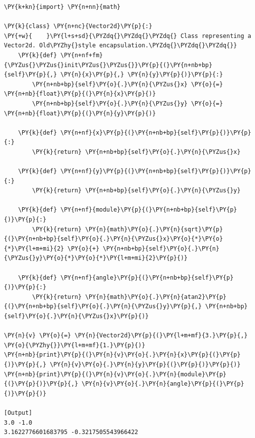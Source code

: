 \begin{Verbatim}[label=\makebox{\url{https://github.com/lucabaldini/cmepda/tree/master/slides/latex/snippets/vector2d\_old\_enc.py}},commandchars=\\\{\}]
\PY{k+kn}{import} \PY{n+nn}{math}

\PY{k}{class} \PY{n+nc}{Vector2d}\PY{p}{:}
\PY{+w}{    }\PY{l+s+sd}{\PYZdq{}\PYZdq{}\PYZdq{} Class representing a Vector2d. Old\PYZhy{}style encapsulation.\PYZdq{}\PYZdq{}\PYZdq{}}   
    \PY{k}{def} \PY{n+nf+fm}{\PYZus{}\PYZus{}init\PYZus{}\PYZus{}}\PY{p}{(}\PY{n+nb+bp}{self}\PY{p}{,} \PY{n}{x}\PY{p}{,} \PY{n}{y}\PY{p}{)}\PY{p}{:}
        \PY{n+nb+bp}{self}\PY{o}{.}\PY{n}{\PYZus{}x} \PY{o}{=} \PY{n+nb}{float}\PY{p}{(}\PY{n}{x}\PY{p}{)}
        \PY{n+nb+bp}{self}\PY{o}{.}\PY{n}{\PYZus{}y} \PY{o}{=} \PY{n+nb}{float}\PY{p}{(}\PY{n}{y}\PY{p}{)}
   
    \PY{k}{def} \PY{n+nf}{x}\PY{p}{(}\PY{n+nb+bp}{self}\PY{p}{)}\PY{p}{:}
        \PY{k}{return} \PY{n+nb+bp}{self}\PY{o}{.}\PY{n}{\PYZus{}x}
       
    \PY{k}{def} \PY{n+nf}{y}\PY{p}{(}\PY{n+nb+bp}{self}\PY{p}{)}\PY{p}{:}
        \PY{k}{return} \PY{n+nb+bp}{self}\PY{o}{.}\PY{n}{\PYZus{}y}
   
    \PY{k}{def} \PY{n+nf}{module}\PY{p}{(}\PY{n+nb+bp}{self}\PY{p}{)}\PY{p}{:}
        \PY{k}{return} \PY{n}{math}\PY{o}{.}\PY{n}{sqrt}\PY{p}{(}\PY{n+nb+bp}{self}\PY{o}{.}\PY{n}{\PYZus{}x}\PY{o}{*}\PY{o}{*}\PY{l+m+mi}{2} \PY{o}{+} \PY{n+nb+bp}{self}\PY{o}{.}\PY{n}{\PYZus{}y}\PY{o}{*}\PY{o}{*}\PY{l+m+mi}{2}\PY{p}{)}
       
    \PY{k}{def} \PY{n+nf}{angle}\PY{p}{(}\PY{n+nb+bp}{self}\PY{p}{)}\PY{p}{:}
        \PY{k}{return} \PY{n}{math}\PY{o}{.}\PY{n}{atan2}\PY{p}{(}\PY{n+nb+bp}{self}\PY{o}{.}\PY{n}{\PYZus{}y}\PY{p}{,} \PY{n+nb+bp}{self}\PY{o}{.}\PY{n}{\PYZus{}x}\PY{p}{)}
  
\PY{n}{v} \PY{o}{=} \PY{n}{Vector2d}\PY{p}{(}\PY{l+m+mf}{3.}\PY{p}{,} \PY{o}{\PYZhy{}}\PY{l+m+mf}{1.}\PY{p}{)}
\PY{n+nb}{print}\PY{p}{(}\PY{n}{v}\PY{o}{.}\PY{n}{x}\PY{p}{(}\PY{p}{)}\PY{p}{,} \PY{n}{v}\PY{o}{.}\PY{n}{y}\PY{p}{(}\PY{p}{)}\PY{p}{)}
\PY{n+nb}{print}\PY{p}{(}\PY{n}{v}\PY{o}{.}\PY{n}{module}\PY{p}{(}\PY{p}{)}\PY{p}{,} \PY{n}{v}\PY{o}{.}\PY{n}{angle}\PY{p}{(}\PY{p}{)}\PY{p}{)}

[Output]
3.0 -1.0
3.1622776601683795 -0.3217505543966422
\end{Verbatim}